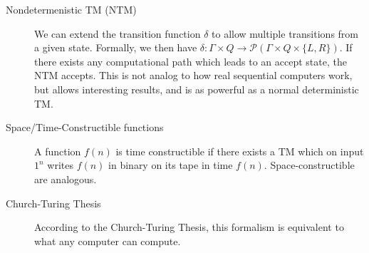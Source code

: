 \begin{description}
    \item[Nondetermenistic TM (NTM)] We can extend the transition function $\delta$ to allow multiple transitions from a given state. Formally, we then have $\delta : \Gamma \times Q \to \mathcal{P}(\Gamma \times Q \times \{L, R\})$. If there exists any computational path which leads to an accept state, the NTM accepts. This is not analog to how real sequential computers work, but allows interesting results, and is as powerful as a normal deterministic TM\@.
    \item[Space/Time-Constructible functions] A function $f(n)$ is time constructible if there exists a TM which on input $1^{n}$ writes $f(n)$ in binary on its tape in time $f(n)$.
    Space-constructible are analogous.
    \item[Church-Turing Thesis] According to the Church-Turing Thesis, this formalism is equivalent to what any computer can compute.
\end{description}
